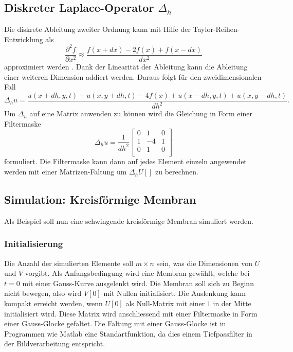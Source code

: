 \subsection{Diskreter Laplace-Operator $\Delta_h$}
Die diskrete Ableitung zweiter Ordnung kann mit Hilfe der Taylor-Reihen-Entwicklung als
\begin{equation*}
	\frac{\partial^2f}{\partial x^2} \approx \frac{f(x+dx)-2f(x)+f(x-dx)}{dx^2}
\end{equation*}
approximiert werden \cite{kreismembran:Digital_Image_processing}.
Dank der Linearität der Ableitung kann die Ableitung einer weiteren Dimension addiert werden.
Daraus folgt für den zweidimensionalen Fall 
\begin{equation*}
	\Delta_h u= \frac{u(x+dh,y,t)+u(x,y+dh,t)-4f(x)+u(x-dh,y,t)+u(x,y-dh,t)}{dh^2}.
\end{equation*}
Um $ \Delta_h $ auf eine Matrix anwenden zu können wird die Gleichung in Form einer Filtermaske 
 \begin{equation}
 	\Delta_h u= \frac{1}{dh^2}
 	\left[ {\begin{array}{ccc}
 			0 & 1  & 0\\
 			1 & -4 & 1\\
 			0 & 1  & 0\\
 	\end{array} } \right]
 \end{equation}
formuliert.
Die Filtermaske kann dann auf jedes Element einzeln angewendet werden mit einer Matrizen-Faltung um $ \Delta_h U[] $ zu berechnen.

\subsection{Simulation: Kreisförmige Membran}
Als Beispiel soll nun eine schwingende kreisförmige Membran simuliert werden.
\subsubsection{Initialisierung}
Die Anzahl der simulierten Elemente soll $ m \times n $ sein, was die Dimensionen von $ U $ und $ V $ vorgibt.
Als Anfangsbedingung wird eine Membran gewählt, welche bei $ t=0 $ mit einer Gauss-Kurve ausgelenkt wird.
Die Membran soll sich zu Beginn nicht bewegen, also wird $ V[0] $ mit Nullen initialisiert.
Die Auslenkung kann kompakt erreicht werden, wenn $ U[0] $ als Null-Matrix mit einer $ 1 $ in der Mitte initialisiert wird. 
Diese Matrix wird anschliessend mit einer Filtermaske in Form einer Gauss-Glocke gefaltet.
Die Faltung mit einer Gauss-Glocke ist in Programmen wie Matlab eine Standartfunktion, da dies einem Tiefpassfilter in der Bildverarbeitung entspricht.

